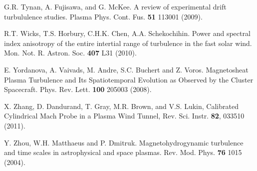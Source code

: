 \documentclass[manuscript]{aastex}
\begin{document}
\begin{thebibliography}{}
 G.R. Tynan, A. Fujisawa, and G. McKee. A review of experimental drift turbululence studies. Plasma Phys. Cont. Fus. {\bf 51} 113001 (2009).

 R.T. Wicks, T.S. Horbury, C.H.K. Chen, A.A. Schekochihin. Power and spectral index anisotropy of the entire intertial range of turbulence in the fast solar wind. Mon. Not. R. Astron. Soc. {\bf 407} L31 (2010).

 E. Yordanova, A. Vaivads, M. Andre, S.C. Buchert and Z. Voros. Magnetosheat Plasma Turbulence and Its Spatiotemporal Evolution as Observed by the Cluster Spacecraft. Phys. Rev. Lett. {\bf 100} 205003 (2008).

 X. Zhang, D. Dandurand, T. Gray, M.R. Brown, and V.S. Lukin, Calibrated Cylindrical Mach Probe in a Plasma Wind Tunnel, Rev. Sci. Instr. {\bf 82}, 033510 (2011).

 Y. Zhou, W.H. Matthaeus and P. Dmitruk. Magnetohydrogynamic turbulence and time scales in astrophysical and space plasmas. Rev. Mod. Phys. {\bf 76} 1015 (2004).

\end{thebibliography}
\end{document}

